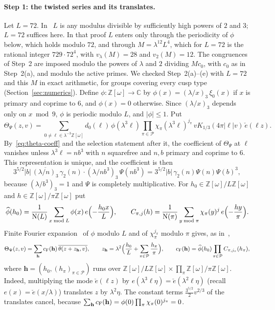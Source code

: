 \documentclass[11pt]{article}
\numberwithin{equation}{section}
\newcommand{\OO}{\mathbb Z[\omega]}
\newcommand{\N}{\mathrm N}
\newcommand{\ce}{\check e}
\begin{document}
\paragraph{Step 1: the twisted series and its translates.} Let $L=72$.
In~\cite[Appendix~A.2]{OAI1112} $L$ is any modulus divisible by sufficiently
high powers of $2$ and $3$; $L=72$ suffices here. In that proof $L$ enters only through the
periodicity of $\phi$ below, which holds modulo $72$, and through $M=\lambda^{12}L^4$, which for $L=72$
is the rational integer $729\cdot72^4$, with $v_\lambda(M)=28$ and $v_2(M)=12$. The congruences of
Step~2 are imposed modulo the powers of $\lambda$ and $2$ dividing $Mc_0$, with $c_0$ as in Step~2(a),
and modulo the active primes. We checked
Step~2(a)--(e) with $L=72$ and this $M$ in exact arithmetic, for groups covering every cusp type
(Section~\ref{sec:numerics}).
Define $\phi:\OO\to\mathbb C$ by $\phi(x)=(\lambda/x)_3\,\xi_0(x)$ if $x$
is primary and coprime to $6$, and $\phi(x)=0$ otherwise. Since
$(\lambda/x)_3$ depends only on $x\bmod9$, $\phi$ is periodic modulo $L$,
and $|\phi|\le1$. Put
\begin{equation}\label{eq:d103}
 \Theta_\Psi(z,v)=\sum_{0\ne\ell\in\lambda^{-3}\OO}d_0(\ell)\,
 \phi(\lambda^3\ell)\prod_{\pi\in\mathcal P}\chi_\pi(\lambda^3\ell)^{j_\pi}\,
 vK_{1/3}(4\pi|\ell|v)\,\ce(\ell z).
\end{equation}
By~\eqref{eq:theta-coeff} and the selection statement after it, the
coefficient of $\Theta_\Psi$ at $\ell$ vanishes unless $\lambda^3\ell=nb^3$
with $n$ squarefree and $n,b$ primary and coprime to $6$. This
representation is unique, and the coefficient is then
\begin{equation}\label{eq:b3-coeff}
 3^{5/2}|b|\,\overline{(\lambda/n)_3}\,\gamma_2(n)\cdot
 (\lambda/nb^3)_3\,\Psi(nb^3)
 =3^{5/2}|b|\,\gamma_2(n)\Psi(n)\Psi(b)^3,
\end{equation}
because $(\lambda/b^3)_3=1$ and $\Psi$ is completely multiplicative. For
$h_0\in\OO/L\OO$ and $h\in\OO/\pi\OO$ put
\begin{equation}\label{eq:d104}
 \widehat\phi(h_0)=\frac1{\N(L)}\sum_{x\bmod L}\phi(x)\,
 e\Bigl(-\frac{h_0x}L\Bigr),\qquad
 C_{\pi,j}(h)=\frac1{\N(\pi)}\sum_{y\bmod\pi}\chi_\pi(y)^j\,
 e\Bigl(-\frac{hy}\pi\Bigr).
\end{equation}
Finite Fourier expansion~\cite[(4.5)]{QF} of $\phi$ modulo $L$ and of
$\chi_\pi^{j_\pi}$ modulo $\pi$ gives, as
in~\cite[Lemma~6.1 and (A.2)--(A.5)]{OAI1112},
\begin{equation}\label{eq:b3-translates}
 \Theta_\Psi(z,v)=\sum_{\mathbf h}c_{\rm F}(\mathbf h)\,
 \overline{\theta(z+z_{\mathbf h},v)},\qquad
 z_{\mathbf h}=\lambda^2\Bigl(\frac{h_0}L+\sum_{\pi\in\mathcal P}
 \frac{h_\pi}\pi\Bigr),\qquad
 c_{\rm F}(\mathbf h)=\widehat\phi(h_0)\prod_{\pi\in\mathcal P}
 C_{\pi,j_\pi}(h_\pi),
\end{equation}
where $\mathbf h=(h_0,(h_\pi)_{\pi\in\mathcal P})$ runs over
$\OO/L\OO\times\prod_\pi\OO/\pi\OO$. Indeed, multiplying the mode
$\ce(\ell z)$ by $e(\lambda^3\ell\eta)=\ce(\lambda^2\ell\eta)$ (recall $e(x)=\ce(x/\lambda)$) translates
$z$ by $\lambda^2\eta$. The constant terms $\frac{3^{5/2}}2v^{2/3}$ of
the translates cancel, because
$\sum_{\mathbf h}c_{\rm F}(\mathbf h)
=\phi(0)\prod_\pi\chi_\pi(0)^{j_\pi}=0$.
\end{document}
